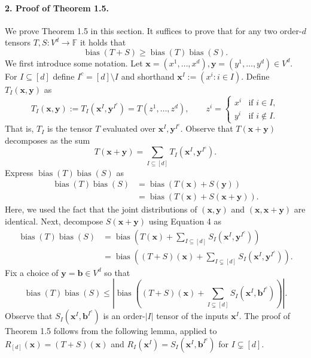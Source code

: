 \paragraph{2. Proof of Theorem 1.5.}
We prove Theorem 1.5 in this section. It suffices to prove that for any two order-$d$ tensors $T,S:V^d\to\mathbb F$ it holds that
\[
\operatorname{bias}(T+S)\geq\operatorname{bias}(T)\operatorname{bias}(S). \tag{3}
\]
We first introduce some notation. Let $\mathbf x=(x^1,\ldots,x^d),\mathbf y=(y^1,\ldots,y^d)\in V^d$. For $I\subseteq[d]$ define $I^c=[d]\setminus I$ and shorthand $\mathbf x^I:=(x^i:i\in I)$. Define $T_I(\mathbf x,\mathbf y)$ as
\[
T_I(\mathbf x,\mathbf y):=T_I(\mathbf x^I,\mathbf y^{I^c})=T(z^1,\ldots,z^d),\qquad
z^i=\begin{cases}x^i&\text{if }i\in I,\\y^i&\text{if }i\notin I.\end{cases}
\]
That is, $T_I$ is the tensor $T$ evaluated over $\mathbf x^I,\mathbf y^{I^c}$. Observe that $T(\mathbf x+\mathbf y)$ decomposes as the sum
\[
T(\mathbf x+\mathbf y)=\sum_{I\subseteq[d]}T_I(\mathbf x^I,\mathbf y^{I^c}). \tag{4}
\]
Express $\operatorname{bias}(T)\operatorname{bias}(S)$ as
\begin{align*}
\operatorname{bias}(T)\operatorname{bias}(S)
&=\operatorname{bias}(T(\mathbf x)+S(\mathbf y))\\
&=\operatorname{bias}(T(\mathbf x)+S(\mathbf x+\mathbf y)).
\end{align*}
Here, we used the fact that the joint distributions of $(\mathbf x,\mathbf y)$ and $(\mathbf x,\mathbf x+\mathbf y)$ are identical. Next, decompose $S(\mathbf x+\mathbf y)$ using Equation 4 as
\begin{align*}
\operatorname{bias}(T)\operatorname{bias}(S)
&=\operatorname{bias}\left(T(\mathbf x)+\sum_{I\subseteq[d]}S_I(\mathbf x^I,\mathbf y^{I^c})\right)\\
&=\operatorname{bias}\left((T+S)(\mathbf x)+\sum_{I\subsetneq[d]}S_I(\mathbf x^I,\mathbf y^{I^c})\right).
\end{align*}
Fix a choice of $\mathbf y=\mathbf b\in V^d$ so that
\[
\operatorname{bias}(T)\operatorname{bias}(S)\leq
\left|\operatorname{bias}\left((T+S)(\mathbf x)+\sum_{I\subsetneq[d]}S_I(\mathbf x^I,\mathbf b^{I^c})\right)\right|.
\]
Observe that $S_I(\mathbf x^I,\mathbf b^{I^c})$ is an order-$|I|$ tensor of the inputs $\mathbf x^I$. The proof of Theorem 1.5 follows from the following lemma, applied to $R_{[d]}(\mathbf x)=(T+S)(\mathbf x)$ and $R_I(\mathbf x^I)=S_I(\mathbf x^I,\mathbf b^{I^c})$ for $I\subsetneq[d]$.
